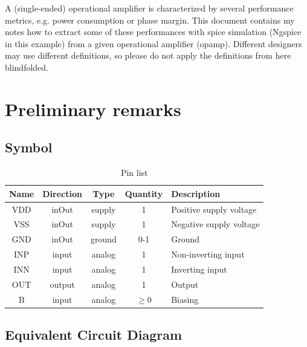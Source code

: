 \documentclass{article}[11pt]
\begin{document}
\notetitle

A (single-ended) operational amplifier is characterized by several 
performance metrics, e.g. power consumption or phase margin. 
This document contains my notes how to extract some of these performances 
with \gls{spice} simulation (Ngspice \cite{ngspice-44} in this example) from 
a given operational amplifier (opamp).
Different designers may use different definitions, so please do not apply 
the definitions from here blindfolded.

\section{Preliminary remarks}

\subsection{Symbol}
\begin{table}[H]
\centering
\caption{Pin list}
\begin{tabular}{ccccl}
\toprule
\textbf{Name}      & \textbf{Direction}    & \textbf{Type}    & \textbf{Quantity} & \textbf{Description}       \\ \midrule
VDD                & inOut                 & supply           & 1                 & Positive supply voltage    \\
VSS                & inOut                 & supply           & 1                 & Negative supply voltage    \\
GND                & inOut                 & ground           & 0-1               & Ground                     \\
INP                & input                 & analog           & 1                 & Non-inverting input        \\
INN                & input                 & analog           & 1                 & Inverting input            \\
OUT                & output                & analog           & 1                 & Output                     \\
B                  & input                 & analog           & $\geq 0$          & Biasing                    \\
\end{tabular}
\label{tab:pinlist}
\end{table}

\subsection{Equivalent Circuit Diagram}
\end{document}
